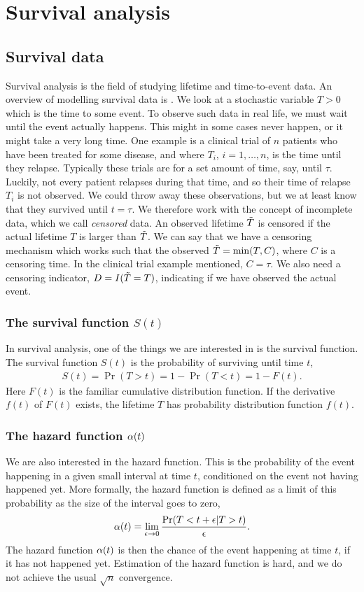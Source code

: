 \chapter{Survival analysis}

\section{Survival data}
Survival analysis is the field of studying lifetime and time-to-event data. An overview of modelling survival data is \citet{ABG}. We look at a stochastic variable $T>0$ which is the time to some event. To observe such data in real life, we must wait until the event actually happens. This might in some cases never happen, or it might take a very long time. One example is a clinical trial of $n$ patients who have been treated for some disease, and where $T_i$, $i=1,\ldots,n$, is the time until they relapse. Typically these trials are for a set amount of time, say, until $\tau$. Luckily, not every patient relapses during that time, and so their time of relapse $T_i$ is not observed. We could throw away these observations, but we at least know that they survived until $t=\tau$. We therefore work with the concept of incomplete data, which we call \textit{censored} data. An observed lifetime $\tilde{T}$ is censored if the actual lifetime $T$ is larger than $\tilde{T}$. We can say that we have a censoring mechanism which works such that the observed $\tilde{T}=\min(T, C)$, where $C$ is a censoring time. In the clinical trial example mentioned, $C=\tau$. We also need a censoring indicator, $D=I(\tilde{T}=T)$, indicating if we have observed the actual event.

\subsection{The survival function $S(t)$}
In survival analysis, one of the things we are interested in is the survival function. The survival function $S(t)$ is the probability of surviving until time $t$,
\begin{align*}
    S(t)=\Pr(T>t)=1-\Pr(T<t)=1-F(t).
\end{align*}
Here $F(t)$ is the familiar cumulative distribution function. If the derivative $f(t)$ of $F(t)$ exists, the lifetime $T$ has probability distribution function $f(t)$.

\subsection{The hazard function $\alpha(t)$}
We are also interested in the hazard function. This is the probability of the event happening in a given small interval at time $t$, conditioned on the event not having happened yet. More formally, the hazard function is defined as a limit of this probability as the size of the interval goes to zero,
\begin{equation*}
    \alpha(t)=\lim_{\epsilon\to0}\frac{\Pr(T<t+\epsilon|T>t)}{\epsilon}.
\end{equation*}
The hazard function $\alpha(t)$ is then the chance of the event happening at time $t$, if it has not happened yet. Estimation of the hazard function is hard, and we do not achieve the usual $\sqrt{n}$ convergence.

